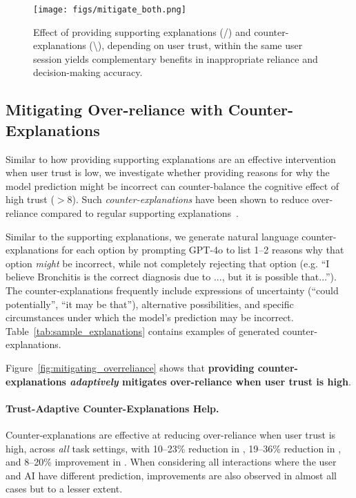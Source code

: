 \begin{figure*}
    \centering
    \texttt{[image: figs/mitigate\_both.png]}
    \caption{Effect of providing supporting explanations (/) and counter-explanations (\textbackslash), depending on user trust, within the same user session yields complementary benefits in inappropriate reliance and decision-making accuracy.}
    \label{fig:mitigating_both}
\end{figure*}



\subsection{Mitigating Over-reliance with Counter-Explanations}
\label{subsec:mitigate_overreliance}

Similar to how providing supporting explanations are an effective intervention when user trust is low, we investigate whether providing reasons for why the model prediction might be incorrect can counter-balance the cognitive effect of high trust ($> 8$). 
Such \emph{counter-explanations} have been shown to reduce over-reliance compared to regular supporting explanations~\cite{si2024large}. 

Similar to the supporting explanations, we generate natural language counter-explanations for each option by prompting GPT-4o to list 1--2 reasons why that option \emph{might} be incorrect, while not completely rejecting that option (e.g. ``I believe Bronchitis is the correct diagnosis due to ..., but it is possible that...''). 
The counter-explanations frequently include expressions of uncertainty (``could potentially'', ``it may be that''), alternative possibilities, and specific circumstances under which the model's prediction may be incorrect. 
Table~\ref{tab:sample_explanations} contains examples of generated counter-explanations.

Figure~\ref{fig:mitigating_overreliance} shows that \textbf{providing counter-explanations \emph{adaptively} mitigates over-reliance when user trust is high}.

\paragraph{Trust-Adaptive Counter-Explanations Help.}
Counter-explanations are effective at reducing over-reliance when user trust is high, across \emph{all} task settings, with 10--23\% reduction in \overreliance, 19--36\% reduction in \totalinapprel, and 8--20\% improvement in \finalacc. 
When considering all interactions where the user and AI have different prediction, improvements are also observed in almost all cases but to a lesser extent.

